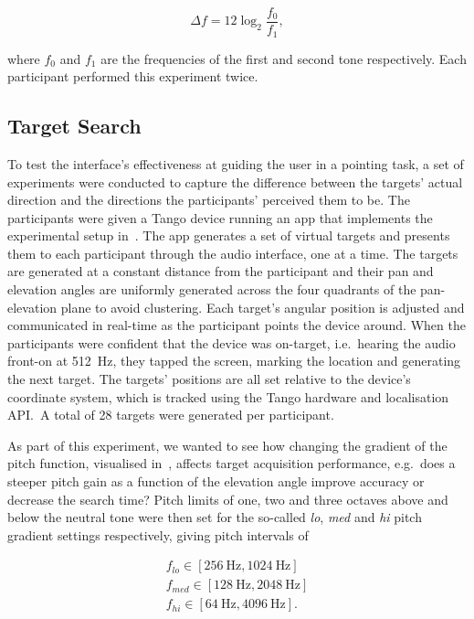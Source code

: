 \documentclass[acmsmall]{acmart}
\begin{document}
\begin{equation}
\label{eq:semitone-difference}
  \Delta f = 12\log_2\frac{f_0}{f_1}, 
\end{equation}

\noindent where $f_0$ and $f_1$ are the frequencies of the first and second tone respectively.
Each participant performed this experiment twice. 

\subsection{Target Search}\label{sec:target_search}

To test the interface's effectiveness at guiding the user in a pointing task, a set of experiments were conducted to capture the difference between the targets' actual direction and the directions the participants' perceived them to be.
The participants were given a Tango device running an app that implements the experimental setup in~. The app generates a set of virtual targets and presents them to each participant through the audio interface, one at a time. 
The targets are generated at a constant distance from the participant and their pan and elevation angles are uniformly generated across the four quadrants of the pan-elevation plane to avoid clustering.
Each target's angular position is adjusted and communicated in real-time as the participant points the device around. 
When the participants were confident that the device was on-target, i.e.~hearing the audio front-on at \SI{512}{\hertz}, they tapped the screen, marking the location and generating the next target.
The targets' positions are all set relative to the device's coordinate system, which is tracked using the Tango hardware and localisation API.\
A total of 28 targets were generated per participant. 

As part of this experiment, we wanted to see how changing the gradient of the pitch function, visualised in~, affects target acquisition performance, e.g.\ does a steeper pitch gain as a function of the elevation angle improve accuracy or decrease the search time?
Pitch limits of one, two and three octaves above and below the neutral tone were then set for the so-called \textit{lo}, \textit{med} and \textit{hi} pitch gradient settings respectively, giving pitch intervals of

\begin{gather*}
  f_{lo}\in[\SI{256}{\hertz}, \SI{1024}{\hertz}]\\
  f_{med}\in[\SI{128}{\hertz}, \SI{2048}{\hertz}]\\
  f_{hi}\in[\SI{64}{\hertz}, \SI{4096}{\hertz}].
\end{gather*}
\end{document}
